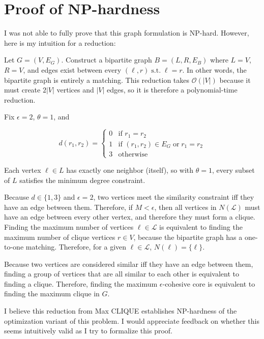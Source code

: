 \documentclass{article}
\begin{document}
\section{Proof of NP-hardness}

I was not able to fully prove that this graph formulation is NP-hard. However, here is my intuition for a reduction:

Let $G = (V, E_G)$. Construct a bipartite graph $B = (L, R, E_B)$ where $L = V$, $R = V$, and edges exist between every $(\ell, r) \mathrel{\text{s.t.}} \ell = r$. In other words, the bipartite graph is entirely a matching. This reduction takes $\mathcal{O}(|V|)$ because it must create $2|V|$ vertices and $|V|$ edges, so it is therefore a polynomial-time reduction.

Fix $\epsilon = 2$, $\theta = 1$, and

\begin{equation}
d(r_1, r_2) = 
\begin{cases}
    0 & \text{if } r_1 = r_2 \\
    1 & \text{if } (r_1, r_2) \in E_G \mathrel{\text{or}} r_1 = r_2 \\
    3 & \text{otherwise}
\end{cases}
\end{equation}

Each vertex $\ell \in L$ has exactly one neighbor (itself), so with $\theta = 1$, every subset of $L$ satisfies the minimum degree constraint.

Because $d \in \{1, 3\}$ and $\epsilon = 2$, two vertices meet the similarity constraint iff they have an edge between them. Therefore, if $M < \epsilon$, then all vertices in $N(\mathcal{L})$ must have an edge between every other vertex, and therefore they must form a clique. Finding the maximum number of vertices $\ell \in \mathcal{L}$ is equivalent to finding the maximum number of clique vertices $r \in V$, because the bipartite graph has a one-to-one matching. Therefore, for a given $\ell \in \mathcal{L}$, $N(\ell) = \{\ell\}$.

Because two vertices are considered similar iff they have an edge between them, finding a group of vertices that are all similar to each other is equivalent to finding a clique. Therefore, finding the maximum $\epsilon$-cohesive core is equivalent to finding the maximum clique in $G$.

I believe this reduction from Max CLIQUE establishes NP-hardness of the optimization variant of this problem. I would appreciate feedback on whether this seems intuitively valid as I try to formalize this proof.
\end{document}
